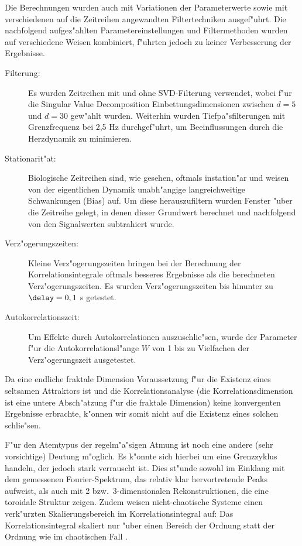 Die Berechnungen wurden auch mit Variationen der Parameterwerte sowie mit verschiedenen
auf die Zeitreihen angewandten Filtertechniken
ausgef"uhrt. Die nachfolgend aufgez"ahlten Parametereinstellungen und Filtermethoden
wurden auf verschiedene Weisen kombiniert, f"uhrten jedoch zu keiner
Verbesserung der Ergebnisse.
\begin{description}
\item[Filterung:] Es wurden Zeitreihen mit und ohne SVD-Filterung verwendet, wobei f"ur
  die Singular Value Decomposition Einbettungsdimensionen zwischen $d=5$ und $d=30$
  gew"ahlt wurden. Weiterhin wurden Tiefpa"sfilterungen mit Grenzfrequenz bei 2,5 Hz
  durchgef"uhrt, um Beeinflussungen durch die Herzdynamik zu minimieren.
\item[Stationarit"at:] Biologische Zeitreihen sind, wie gesehen, oftmals instation"ar und weisen von
  der eigentlichen Dynamik unabh"angige langreichweitige Schwankungen (Bias) auf. 
  Um diese herauszufiltern wurden Fenster "uber die Zeitreihe gelegt, in denen dieser
  Grundwert berechnet und nachfolgend von den Signalwerten subtrahiert wurde.
\item[Verz"ogerungszeiten:] Kleine Verz"ogerungszeiten bringen bei der Berechnung der
  Korrelationsintegrale oftmals besseres Ergebnisse als die berechneten
  Verz"ogerungszeiten. Es wurden Verz"ogerungszeiten bis hinunter zu $\delay=0,1$ s
  getestet.
\item[Autokorrelationszeit:] Um Effekte durch Autokorrelationen auszuschlie"sen, wurde
  der Parameter f"ur die Autokorrelationsl"ange $W$ von 1 bis zu Vielfachen der
  Verz"ogerungszeit ausgetestet.
\end{description}
Da eine endliche fraktale Dimension Voraussetzung f"ur die Existenz eines seltsamen
Attraktors ist und die Korrelationsanalyse (die Korrelationsdimension ist eine untere
Absch"atzung f"ur die fraktale Dimension) keine konvergenten Ergebnisse erbrachte, k"onnen wir somit
nicht auf die Existenz eines solchen schlie"sen. 

F"ur den Atemtypus der regelm"a"sigen Atmung ist noch eine andere (sehr vorsichtige)
Deutung m"oglich. Es k"onnte sich hierbei um eine Grenzzyklus handeln, der jedoch stark
verrauscht ist. Dies st"unde sowohl im Einklang mit dem gemessenen Fourier-Spektrum, das
relativ klar hervortretende Peaks aufweist, als auch mit 2 bzw.\ 3-dimensionalen
Rekonstruktionen, die eine toroidale Struktur zeigen. Zudem weisen nicht-chaotische Systeme
einen verk"urzten Skalierungsbereich im Korrelationsintegral auf: Das Korrelationsintegral
skaliert nur "uber einen Bereich der Ordnung  statt der Ordnung  wie
im chaotischen Fall \cite{Theiler}.

